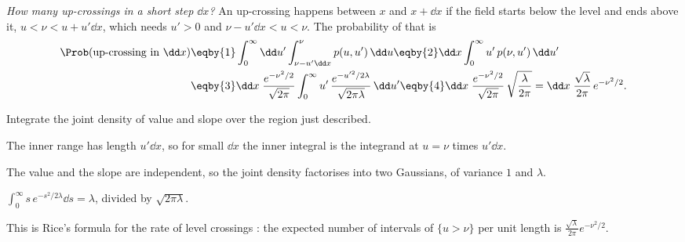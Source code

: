 \emph{How many up-crossings in a short step $\dd x$?} An up-crossing happens between $x$ and $x+\dd x$ if the
field starts below the level and ends above it, $u<\nu<u+u'\dd x$, which needs $u'>0$ and
$\nu-u'\dd x<u<\nu$. The probability of that is
\begin{align}
  \Prob(\text{up-crossing in }\dd x)
  &\eqby{1}\int_0^\infty\dd u'\int_{\nu-u'\dd x}^{\nu}p(u,u')\,\dd u
   \eqby{2}\dd x\int_0^\infty u'\,p(\nu,u')\,\dd u'\nonumber\\
  &\eqby{3}\dd x\;\frac{e^{-\nu^2/2}}{\sqrt{2\pi}}\int_0^\infty u'\,\frac{e^{-u'^2/2\lambda}}{\sqrt{2\pi\lambda}}\,\dd u'
   \eqby{4}\dd x\;\frac{e^{-\nu^2/2}}{\sqrt{2\pi}}\,\sqrt{\frac{\lambda}{2\pi}}
   =\dd x\;\frac{\sqrt\lambda}{2\pi}\,e^{-\nu^2/2}.
  \label{12a:eq:rice}
\end{align}
\begin{explain}
  \item Integrate the joint density of value and slope over the region just described.
  \item The inner range has length $u'\dd x$, so for small $\dd x$ the inner integral is the integrand at
        $u=\nu$ times $u'\dd x$.
  \item The value and the slope are independent, so the joint density factorises into two Gaussians, of
        variance $1$ and $\lambda$.
  \item $\int_0^\infty s\,e^{-s^2/2\lambda}\dd s=\lambda$, divided by $\sqrt{2\pi\lambda}$.
\end{explain}
This is Rice's formula for the rate of level crossings \cite{Rice1944}: the expected number of intervals of
$\{u>\nu\}$ per unit length is $\frac{\sqrt\lambda}{2\pi}e^{-\nu^2/2}$.

